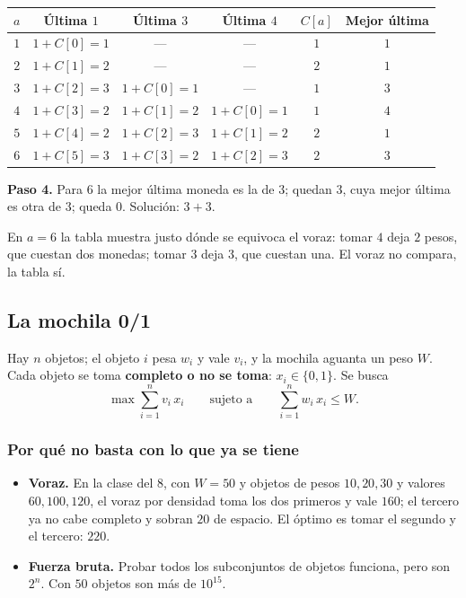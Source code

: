 \documentclass[11pt,letterpaper]{article}
\begin{document}
\begin{center}
\begin{tabular}{cccccc}
  \toprule
  $a$ & \textbf{Última $1$} & \textbf{Última $3$} & \textbf{Última $4$}
      & $C[a]$ & \textbf{Mejor última} \\
  \midrule
  $1$ & $1 + C[0] = 1$ & --- & --- & $1$ & $1$ \\
  $2$ & $1 + C[1] = 2$ & --- & --- & $2$ & $1$ \\
  $3$ & $1 + C[2] = 3$ & $1 + C[0] = 1$ & --- & $1$ & $3$ \\
  $4$ & $1 + C[3] = 2$ & $1 + C[1] = 2$ & $1 + C[0] = 1$ & $1$ & $4$ \\
  $5$ & $1 + C[4] = 2$ & $1 + C[2] = 3$ & $1 + C[1] = 2$ & $2$ & $1$ \\
  $6$ & $1 + C[5] = 3$ & $1 + C[3] = 2$ & $1 + C[2] = 3$ & $2$ & $3$ \\
  \bottomrule
\end{tabular}
\end{center}

\textbf{Paso 4.} Para $6$ la mejor última moneda es la de $3$; quedan
$3$, cuya mejor última es otra de $3$; queda $0$. Solución: $3 + 3$.

En $a = 6$ la tabla muestra justo dónde se equivoca el voraz: tomar
$4$ deja $2$ pesos, que cuestan dos monedas; tomar $3$ deja $3$, que
cuestan una. El voraz no compara, la tabla sí.


\subsection*{La mochila 0/1}

\begin{definicion}
  Hay $n$ objetos; el objeto $i$ pesa $w_i$ y vale $v_i$, y la mochila
  aguanta un peso $W$. Cada objeto se toma \textbf{completo o no se
  toma}: $x_i \in \{0, 1\}$. Se busca
  \[
    \max \sum_{i=1}^{n} v_i\, x_i
    \qquad \text{sujeto a} \qquad
    \sum_{i=1}^{n} w_i\, x_i \leq W .
  \]
\end{definicion}

\subsubsection*{Por qué no basta con lo que ya se tiene}

\begin{itemize}[itemsep=0.3em]
  \item \textbf{Voraz.} En la clase del $8$, con $W = 50$ y objetos de
        pesos $10, 20, 30$ y valores $60, 100, 120$, el voraz por
        densidad toma los dos primeros y vale $160$; el tercero ya no
        cabe completo y sobran $20$ de espacio. El óptimo es tomar el
        segundo y el tercero: $220$.
  \item \textbf{Fuerza bruta.} Probar todos los subconjuntos de
        objetos funciona, pero son $2^{n}$. Con $50$ objetos son más
        de $10^{15}$.
\end{itemize}
\end{document}
